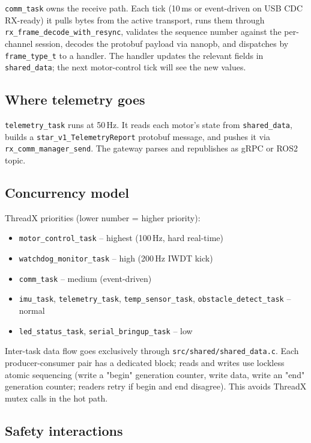 \texttt{comm\_task} owns the receive path. Each tick (10\,ms or
event-driven on USB CDC RX-ready) it pulls bytes from the active
transport, runs them through \texttt{rx\_frame\_decode\_with\_resync},
validates the sequence number against the per-channel session,
decodes the protobuf payload via nanopb, and dispatches by
\texttt{frame\_type\_t} to a handler. The handler updates the
relevant fields in \texttt{shared\_data}; the next motor-control
tick will see the new values.

\subsection{Where telemetry goes}

\texttt{telemetry\_task} runs at 50\,Hz. It reads each motor's state
from \texttt{shared\_data}, builds a \texttt{star\_v1\_TelemetryReport}
protobuf message, and pushes it via \texttt{rx\_comm\_manager\_send}.
The gateway parses and republishes as gRPC or ROS2 topic.

\subsection{Concurrency model}

ThreadX priorities (lower number = higher priority):

\begin{itemize}
  \item \texttt{motor\_control\_task} -- highest (100\,Hz, hard real-time)
  \item \texttt{watchdog\_monitor\_task} -- high (200\,Hz IWDT kick)
  \item \texttt{comm\_task} -- medium (event-driven)
  \item \texttt{imu\_task}, \texttt{telemetry\_task},
        \texttt{temp\_sensor\_task},
        \texttt{obstacle\_detect\_task} -- normal
  \item \texttt{led\_status\_task},
        \texttt{serial\_bringup\_task} -- low
\end{itemize}

Inter-task data flow goes exclusively through
\texttt{src/shared/shared\_data.c}. Each producer-consumer pair has a
dedicated block; reads and writes use lockless atomic sequencing
(write a "begin" generation counter, write data, write an "end"
generation counter; readers retry if begin and end disagree). This
avoids ThreadX mutex calls in the hot path.

\subsection{Safety interactions}

